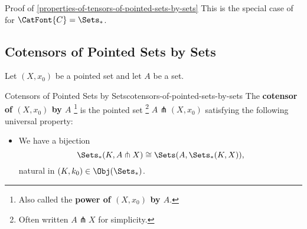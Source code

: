 \begin{Proof}{Proof of \cref{properties-of-tensors-of-pointed-sets-by-sets}}
    This is the special case of  for $\CatFont{C}=\Sets_{*}$.
\end{Proof}
\subsection{Cotensors of Pointed Sets by Sets}\label{subsection-cotensors-by-sets}
Let $(X,x_{0})$ be a pointed set and let $A$ be a set.%
\begin{definition}{Cotensors of Pointed Sets by Sets}{cotensors-of-pointed-sets-by-sets}%
    The \textbf{cotensor of $(X,x_{0})$ by $A$}%
    \footnote{%
        Also called the \textbf{power of $(X,x_{0})$ by $A$}.%
    } %
    is the pointed set%
    \footnote{%
        Often written $A\pitchfork X$ for simplicity.
        \par\vspace*{\TCBBoxCorrection}
    } %
    $A\pitchfork(X,x_{0})$ satisfying the following universal property:

    \begin{itemize}
        \item[\UP]We have a bijection
        \[%
             \Sets_{*}(K,A\pitchfork X)%
             \cong%
             \Sets(A,\Sets_{*}(K,X)),%
        \]%
        natural in $(K,k_{0})\in\Obj(\Sets_{*})$.
    \end{itemize}%
\end{definition}
